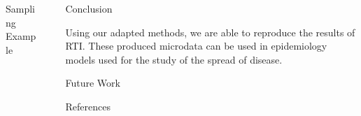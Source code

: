 \documentclass[final]{beamer}
\newlength{\sepwid}
\newlength{\onecolwid}
\newlength{\twocolwid}
\begin{document}
\begin{frame}[t]
\begin{columns}[t]
\begin{column}{\twocolwid}
\begin{columns}[t,totalwidth=\twocolwid]
\begin{column}{\onecolwid}
\begin{block}{Sampling Example}
\end{block}


\end{column} %

\end{columns} %

\end{column} %

\begin{column}{\sepwid}\end{column} %

\begin{column}{\onecolwid} %


\begin{block}{Conclusion}

Using our adapted methods, we are able to reproduce the results of RTI.  These produced microdata can be used in epidemiology models used for the study of the spread of disease.

\end{block}


\begin{block}{Future Work}

\end{block}


\begin{block}{References}

\tiny{
\vspace{0.75in}}

\end{block}


\end{column}
\end{columns}
\end{frame}
\end{document}
